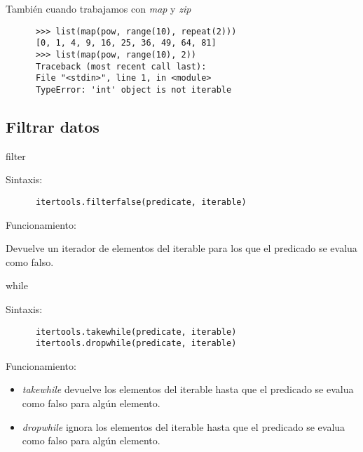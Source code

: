 \documentclass[spanish]{beamer}
\begin{document}
  \begin{frame}[fragile]

    También cuando trabajamos con \textit{map} y \textit{zip}

    \begin{lstlisting}
      >>> list(map(pow, range(10), repeat(2))) 
      [0, 1, 4, 9, 16, 25, 36, 49, 64, 81]
      >>> list(map(pow, range(10), 2)) 
      Traceback (most recent call last):
      File "<stdin>", line 1, in <module>
      TypeError: 'int' object is not iterable
    \end{lstlisting}
    
  \end{frame}

  \subsection{Filtrar datos}
  \begin{frame}[fragile]{filter}

    Sintaxis:

    \begin{lstlisting}
      itertools.filterfalse(predicate, iterable)
    \end{lstlisting}

    Funcionamiento:

    Devuelve un iterador de elementos del iterable para los que el
    predicado se evalua como falso.
    
  \end{frame}

  \begin{frame}[fragile]{while}

    Sintaxis:
    
    \begin{lstlisting}
      itertools.takewhile(predicate, iterable)
      itertools.dropwhile(predicate, iterable)
    \end{lstlisting}

    Funcionamiento:

    \begin{itemize}
    \item \textit{takewhile} devuelve los elementos del iterable hasta
      que el predicado se evalua como falso para algún elemento.
    \item \textit{dropwhile} ignora los elementos del iterable hasta que el
    predicado se evalua como falso para algún elemento.
    \end{itemize}

  \end{frame}
\end{document}
